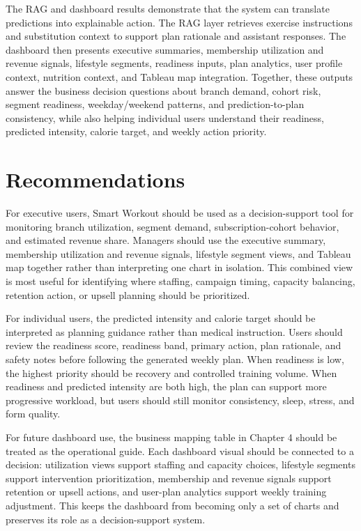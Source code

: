\documentclass{aitthesis}
\begin{document}
The RAG and dashboard results demonstrate that the system can translate predictions into explainable action. The RAG layer retrieves exercise instructions and substitution context to support plan rationale and assistant responses. The dashboard then presents executive summaries, membership utilization and revenue signals, lifestyle segments, readiness inputs, plan analytics, user profile context, nutrition context, and Tableau map integration. Together, these outputs answer the business decision questions about branch demand, cohort risk, segment readiness, weekday/weekend patterns, and prediction-to-plan consistency, while also helping individual users understand their readiness, predicted intensity, calorie target, and weekly action priority.

\section{Recommendations}

For executive users, Smart Workout should be used as a decision-support tool for monitoring branch utilization, segment demand, subscription-cohort behavior, and estimated revenue share. Managers should use the executive summary, membership utilization and revenue signals, lifestyle segment views, and Tableau map together rather than interpreting one chart in isolation. This combined view is most useful for identifying where staffing, campaign timing, capacity balancing, retention action, or upsell planning should be prioritized.

For individual users, the predicted intensity and calorie target should be interpreted as planning guidance rather than medical instruction. Users should review the readiness score, readiness band, primary action, plan rationale, and safety notes before following the generated weekly plan. When readiness is low, the highest priority should be recovery and controlled training volume. When readiness and predicted intensity are both high, the plan can support more progressive workload, but users should still monitor consistency, sleep, stress, and form quality.

For future dashboard use, the business mapping table in Chapter 4 should be treated as the operational guide. Each dashboard visual should be connected to a decision: utilization views support staffing and capacity choices, lifestyle segments support intervention prioritization, membership and revenue signals support retention or upsell actions, and user-plan analytics support weekly training adjustment. This keeps the dashboard from becoming only a set of charts and preserves its role as a decision-support system.
\end{document}
